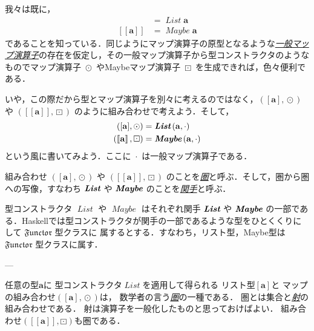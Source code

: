\documentclass[a4paper,draft]{jsbook}
\def\[{\left[\!\left[}
\def\]{\right]\!\right]}
\newcommand{\programminglanguage}[1]{\textsf{#1}}
\newcommand{\haskell}{\programminglanguage{Haskell}}
\newcommand{\keyword}[1]{{\underline{\emph{#1}}}}
\newcommand{\mType}[1]{\mathbf{#1}}
\newcommand{\mListType}[1]{[\mType{#1}]}
\newcommand{\mMaybeType}[1]{\[\mType{#1}\]}
\newcommand{\mFunctor}[1]{\textit{\textbf{#1}}}
\newcommand{\mTypeConstructor}[1]{\mathit{#1}} %
\newcommand{\mSpecialTypeClass}[1]{\mathfrak{#1}} %
\newcommand{\mFunctorTypeClass}{\mSpecialTypeClass{Functor}}
\newcommand{\mTupleOf}[1]{\left(#1\right)}
\DeclareMathOperator{\mMap}{\cdot}
\DeclareMathOperator{\mMapList}{\odot}
\DeclareMathOperator{\mMapMaybe}{\boxdot}
\DeclareMathOperator{\mListTypeConstructor}{\mTypeConstructor{List}}
\DeclareMathOperator{\mMaybeTypeConstructor}{\mTypeConstructor{Maybe}}
\DeclareMathOperator{\mListFunctor}{\mFunctor{List}}
\DeclareMathOperator{\mMaybeFunctor}{\mFunctor{Maybe}}
\DeclareMathOperator{\mListProjection}{\xmapsto{\;\mListFunctor\;}}
\DeclareMathOperator{\mMaybeProjection}{\xmapsto{\;\mMaybeFunctor\;}}
\newcommand{\mathTypeParameter}[1]{\mathbf{#1}}
\newcommand{\mathFunctor}[1]{\textsl{#1}} %
\newcommand{\mathTypeConstructor}[1]{\mathit{#1}} %
\newcommand{\mathListWith}[1]{\left[#1\right]}
\newcommand{\mathMaybeWith}[1]{\[#1\]}
\newcommand{\mathPureWith}[1]{\left\langle#1\right\rangle}
\newcommand{\mathMaybeType}[1]{\mathMaybeWith{\mathTypeParameter{#1}}}
\DeclareMathOperator{\mathList}{\mathTypeConstructor{List}}
\DeclareMathOperator{\mathListFunctor}{\mathFunctor{List}}
\DeclareMathOperator{\mathMaybeFunctor}{\mathFunctor{Maybe}}
\newcommand{\mathMaybeMap}{\mathbin{\boxdot}}
\begin{document}
我々は既に，
\begin{align}
\mListType{a}&=\mListTypeConstructor\mType{a}\\
\mMaybeType{a}&=\mMaybeTypeConstructor\mType{a}
\end{align}
であることを知っている．同じようにマップ演算子の原型となるような\keyword{一般マップ演算子}の存在を仮定し，その一般マップ演算子から型コンストラクタのようなものでマップ演算子 $\mMapList$ やMaybeマップ演算子 $\mMapMaybe$ を生成できれば，色々便利である．

いや，この際だから型とマップ演算子を別々に考えるのではなく，$\mTupleOf{\mListType{a},\mMapList}$ や $\mTupleOf{\mMaybeType{a},\mMapMaybe}$ のように組み合わせで考えよう．そして，
\begin{align}
\mTupleOf{\mListType{a},\mMapList}&=\mListFunctor\mTupleOf{\mType{a},\mMap}\\
\mTupleOf{\mMaybeType{a},\mMapMaybe}
&=\mMaybeFunctor\mTupleOf{\mType{a},\mMap}
\end{align}
という風に書いてみよう．ここに $\mMap$ は一般マップ演算子である．

組み合わせ $\mTupleOf{\mListType{a},\mMapList}$ や $\mTupleOf{\mMaybeType{a},\mMapMaybe}$ のことを\keyword{圏}と呼ぶ．そして，圏から圏への写像，すなわち $\mListFunctor$ や $\mMaybeFunctor$ のことを\keyword{関手}と呼ぶ．

型コンストラクタ $\mListTypeConstructor$ や $\mMaybeTypeConstructor$ はそれぞれ関手 $\mListFunctor$ や $\mMaybeFunctor$ の一部である．\haskell では型コンストラクタが関手の一部であるような型をひとくくりにして $\mFunctorTypeClass$ 型クラスに
属するとする．すなわち，リスト型，Maybe型は $\mFunctorTypeClass$ 型クラスに属す．


---


任意の型$\mathTypeParameter{a}$に
型コンストラクタ$\mathList$を適用して得られる
リスト型$\mListType{a}$と
マップの組み合わせ$\mTupleOf{\mListType{a},\mMapList}$は，
数学者の言う\keyword{圏}の一種である．
圏とは集合と\keyword{射}の組み合わせである．
射は演算子を一般化したものと思っておけばよい．
組み合わせ$\mTupleOf{\mathMaybeType{a},\mathMaybeMap}$も圏である．
\end{document}
